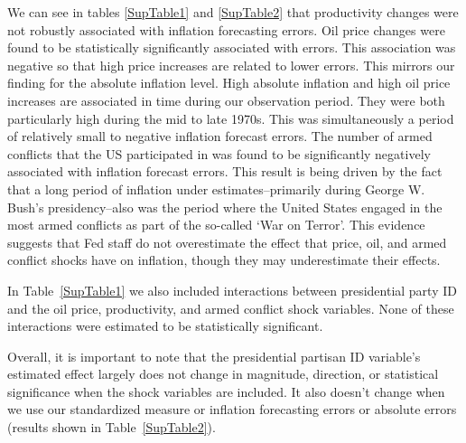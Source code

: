 \documentclass[a4paper]{article}
\begin{document}
We can see in tables \ref{SupTable1} and \ref{SupTable2} that productivity changes were not robustly associated with inflation forecasting errors. Oil price changes were found to be statistically significantly associated with errors. This association was negative so that high price increases are related to lower errors. This mirrors our finding for the absolute inflation level. High absolute inflation and high oil price increases are associated in time during our observation period. They were both particularly high during the mid to late 1970s. This was simultaneously a period of relatively small to negative inflation forecast errors. The number of armed conflicts that the US participated in was found to be significantly negatively associated with inflation forecast errors. This result is being driven by the fact that a long period of inflation under estimates--primarily during George W. Bush's presidency--also was the period where the United States engaged in the most armed conflicts as part of the so-called `War on Terror'. This evidence suggests that Fed staff do not overestimate the effect that price, oil, and armed conflict shocks have on inflation, though they may underestimate their effects.

In Table~\ref{SupTable1} we also included interactions between presidential party ID and the oil price, productivity, and armed conflict shock variables. None of these interactions were estimated to be statistically significant.

Overall, it is important to note that the presidential partisan ID variable's estimated effect largely does not change in magnitude, direction, or statistical significance when the shock variables are included. It also doesn't change when we use our standardized measure or inflation forecasting errors or absolute errors (results shown in Table~\ref{SupTable2}).
\end{document}
